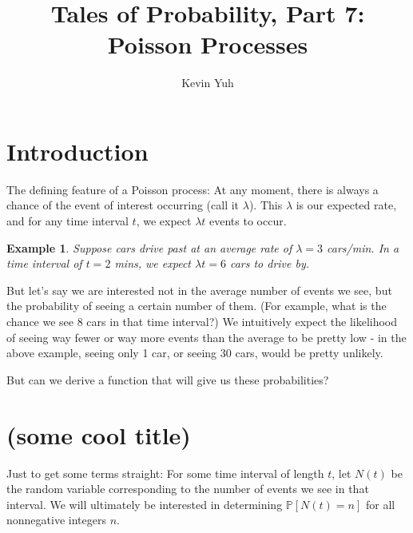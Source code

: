\documentclass{article}
\title{Tales of Probability, Part 7: Poisson Processes}
\author{Kevin Yuh}
\newtheorem{exmp}{Example}
\begin{document}
\maketitle


\section{Introduction}

The defining feature of a Poisson process: At any moment, there is always a chance of the event of interest occurring (call it $\lambda$). This $\lambda$ is our expected rate, and for any time interval $t$, we expect $\lambda t$ events to occur.

\begin{exmp}
Suppose cars drive past at an average rate of $\lambda = 3$ cars/min. In a time interval of $t = 2$ mins, we expect $\lambda t = 6$ cars to drive by. 
\end{exmp}

But let's say we are interested not in the average number of events we see, but the probability of seeing a certain number of them. (For example, what is the chance we see 8 cars in that time interval?) We intuitively expect the likelihood of seeing way fewer or way more events than the average to be pretty low - in the above example, seeing only 1 car, or seeing 30 cars, would be pretty unlikely. 

But can we derive a function that will give us these probabilities?



\section{(some cool title)}

Just to get some terms straight: For some time interval of length $t$, let $N(t)$ be the random variable corresponding to the number of events we see in that interval. We will ultimately be interested in determining $\mathbb{P}\left[N(t) = n\right]$ for all nonnegative integers $n$. 
\end{document}
